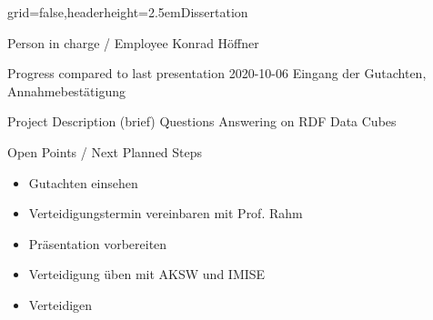 \documentclass[english]{kiesgrube}
\begin{document}
\newcommand{\footer}[0]{\tikz{\draw (image.south west) node[anchor=west]{IMISE | MIG | Konrad Höffner | 2020-10-12};}}

\begin{poster}{grid=false,headerheight=2.5em}{}{Dissertation}{}{}
\begin{posterbox}[name=person,column=0,row=0]{Person in charge / Employee}
Konrad Höffner
\end{posterbox}
\begin{posterbox}[name=progress,below=person]{Progress compared to last presentation}
2020-10-06 Eingang der Gutachten, Annahmebestätigung
\end{posterbox}
\begin{posterbox}[name=description,column=1,row=0]{Project Description (brief)}
Questions Answering on RDF Data Cubes
\end{posterbox}
\begin{posterbox}[name=open,column=0,below=progress]{Open Points / Next Planned Steps}
\begin{itemize}
\item Gutachten einsehen
\item Verteidigungstermin vereinbaren mit Prof. Rahm
\item Präsentation vorbereiten
\item Verteidigung üben mit AKSW und IMISE
\item Verteidigen
\end{itemize}
\end{posterbox}

\end{poster}
\end{document}
